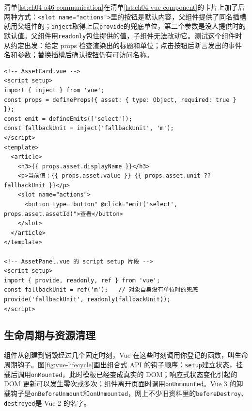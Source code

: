 清单\ref{lst:ch04-a46-communication}在清单\ref{lst:ch04-vue-component}的卡片上加了后两种方式：\texttt{<slot name="actions">}里的按钮是默认内容，父组件提供了同名插槽就用父组件的；\texttt{inject}取得上层\texttt{provide}的兜底单位，第二个参数是没人提供时的默认值。父组件用\texttt{readonly}包住提供的值，子组件无法改动它。测试这个组件时从约定出发：给定 props 检查渲染出的标题和单位；点击按钮后断言发出的事件名和参数；替换插槽后确认按钮仍有可访问名称。

\begin{lstlisting}[label={lst:ch04-a46-communication},language=Vue,caption={Vue props、emit、slot 与 provide/inject}]
<!-- AssetCard.vue -->
<script setup>
import { inject } from 'vue';
const props = defineProps({ asset: { type: Object, required: true } });
const emit = defineEmits(['select']);
const fallbackUnit = inject('fallbackUnit', 'm');
</script>
<template>
  <article>
    <h3>{{ props.asset.displayName }}</h3>
    <p>当前值：{{ props.asset.value }} {{ props.asset.unit ?? fallbackUnit }}</p>
    <slot name="actions">
      <button type="button" @click="emit('select', props.asset.assetId)">查看</button>
    </slot>
  </article>
</template>

<!-- AssetPanel.vue 的 script setup 片段 -->
<script setup>
import { provide, readonly, ref } from 'vue';
const fallbackUnit = ref('m');   // 对象自身没有单位时的兜底
provide('fallbackUnit', readonly(fallbackUnit));
</script>
\end{lstlisting}

\subsection{生命周期与资源清理}

组件从创建到销毁经过几个固定时刻，Vue 在这些时刻调用你登记的函数，叫生命周期钩子。图\ref{fig:vue-lifecycle}画出组合式 API 的钩子顺序：\texttt{setup}建立状态，挂载后调用\texttt{onMounted}，此时模板已经变成真实的 DOM；响应式状态变化引起的 DOM 更新可以发生零次或多次；组件离开页面时调用\texttt{onUnmounted}。Vue 3 的卸载钩子是\texttt{onBeforeUnmount}和\texttt{onUnmounted}，网上不少旧资料里的\texttt{beforeDestroy}、\texttt{destroyed}是 Vue 2 的名字。

